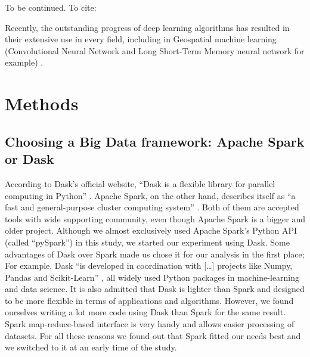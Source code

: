 \documentclass[conference]{IEEEtran}
\begin{document}
To be continued.
To cite: \cite{Theofilatos2017, Abellan2013, Lin2015}

Recently, the outstanding progress of deep learning algorithms has resulted in their extensive use in every field, including in Geospatial machine learning (Convolutional Neural Network and Long Short-Term Memory neural network for example) \cite{Yuan2018, QChen2016}.





\section{Methods}
\subsection{Choosing a Big Data framework: Apache Spark or Dask}
According to Dask’s official website, “Dask is a flexible library for parallel computing in Python” \cite{dask}. Apache Spark, on the other hand, describes itself as “a fast and general-purpose cluster computing system” \cite{spark}. Both of them are accepted tools with wide supporting community, even though Apache Spark is a bigger and older project. Although we almost exclusively used Apache Spark’s Python API (called “pySpark”) in this study, we started our experiment using Dask. Some advantages of Dask over Spark made us chose it for our analysis in the first place; For example, Dask “is developed in coordination with […] projects like Numpy, Pandas and Scikit-Learn” \cite{dask}, all widely used Python packages in machine-learning and data science. It is also admitted that Dask is lighter than Spark and designed to be more flexible in terms of applications and algorithms. However, we found ourselves writing a lot more code using Dask than Spark for the same result. Spark map-reduce-based interface is very handy and allows easier processing of datasets. For all these reasons we found out that Spark fitted our needs best and we switched to it at an early time of the study.
\end{document}
